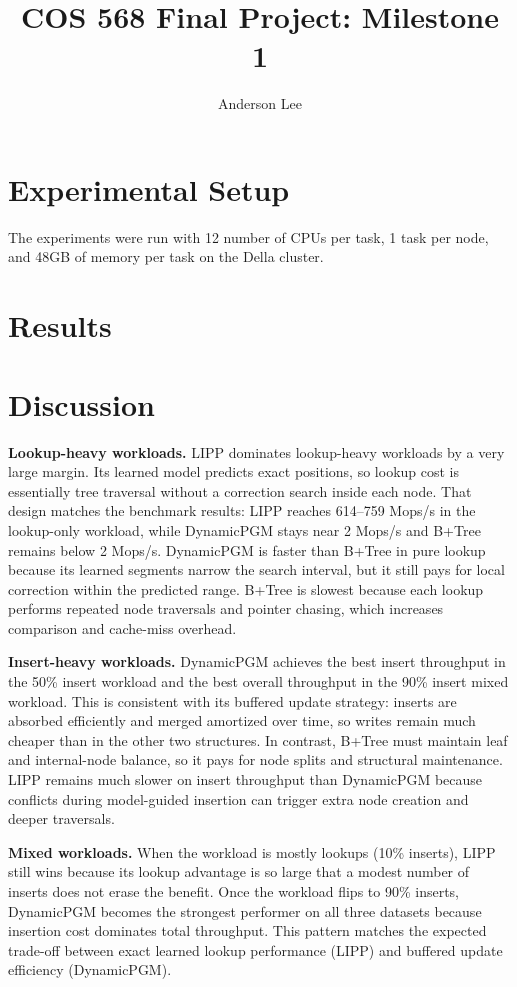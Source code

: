 \documentclass{MITcsail}
\title{COS 568 Final Project: Milestone 1}
\author{Anderson Lee}
\begin{document}
\maketitle
\thispagestyle{firstpagestyle}

\section{Experimental Setup}
The experiments were run with 12 number of CPUs per task, 1 task per node, and 48GB of memory per task on the Della cluster.

\section{Results}



\section{Discussion}
\textbf{Lookup-heavy workloads.} LIPP dominates lookup-heavy workloads by a very large margin. Its learned model predicts exact positions, so lookup cost is essentially tree traversal without a correction search inside each node. That design matches the benchmark results: LIPP reaches 614--759 Mops/s in the lookup-only workload, while DynamicPGM stays near 2 Mops/s and B+Tree remains below 2 Mops/s. DynamicPGM is faster than B+Tree in pure lookup because its learned segments narrow the search interval, but it still pays for local correction within the predicted range. B+Tree is slowest because each lookup performs repeated node traversals and pointer chasing, which increases comparison and cache-miss overhead.

\textbf{Insert-heavy workloads.} DynamicPGM achieves the best insert throughput in the 50\% insert workload and the best overall throughput in the 90\% insert mixed workload. This is consistent with its buffered update strategy: inserts are absorbed efficiently and merged amortized over time, so writes remain much cheaper than in the other two structures. In contrast, B+Tree must maintain leaf and internal-node balance, so it pays for node splits and structural maintenance. LIPP remains much slower on insert throughput than DynamicPGM because conflicts during model-guided insertion can trigger extra node creation and deeper traversals.

\textbf{Mixed workloads.} When the workload is mostly lookups (10\% inserts), LIPP still wins because its lookup advantage is so large that a modest number of inserts does not erase the benefit. Once the workload flips to 90\% inserts, DynamicPGM becomes the strongest performer on all three datasets because insertion cost dominates total throughput. This pattern matches the expected trade-off between exact learned lookup performance (LIPP) and buffered update efficiency (DynamicPGM).
\end{document}

